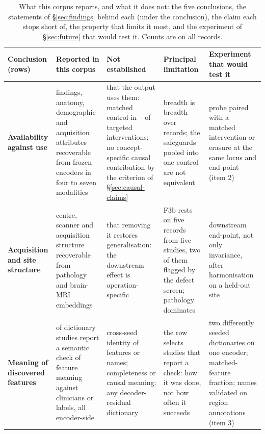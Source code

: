 \begin{table}[!tb]
\centering\footnotesize\setlength\tabcolsep{3pt}\renewcommand{\arraystretch}{1.08}
\caption{What this corpus reports, and what it does not: the five conclusions, the statements of
\S\ref{sec:findings} behind each (under the conclusion), the claim each stops short of, the property that limits it most, and the
experiment of \S\ref{sec:future} that would test it. Counts are on all records.}
\label{tab:synthesis}
\begin{tabular}{@{}L{2.45cm}L{3.3cm}L{3.2cm}L{3.2cm}L{3.2cm}@{}}
\toprule
Conclusion (rows) & Reported in this corpus & Not established & Principal limitation & Experiment that would test it \\
\midrule
\textbf{Availability against use}  & findings, anatomy, demographic and acquisition attributes recoverable from frozen encoders in four to seven modalities & that the output uses them: matched control in \Vspca{}--\Vspc{} of \Vspcn{} targeted interventions; no concept-specific causal contribution by the criterion of \S\ref{sec:causal-claims} & breadth is breadth over records; the safeguards pooled into one control are not equivalent & probe paired with a matched intervention or erasure at the same locus and end-point (item 2) \\
\addlinespace[2pt]
\textbf{Acquisition and site structure}  & centre, scanner and acquisition structure recoverable from pathology and brain-MRI embeddings & that removing it restores generalisation: the downstream effect is operation-specific & F3b rests on five records from five studies, two of them flagged by the defect screen; pathology dominates & downstream end-point, not only invariance, after harmonisation on a held-out site \\
\addlinespace[2pt]
\textbf{Meaning of discovered features}  & \Nsaeval{} of \Nsae{} dictionary studies report a semantic check of feature meaning against clinicians or labels, all encoder-side & cross-seed identity of features or names; completeness or causal meaning; any decoder-residual dictionary & the row selects studies that report a check: how it was done, not how often it succeeds & two differently seeded dictionaries on one encoder; matched-feature fraction; names validated on region annotations (item 3) \\

\end{tabular}
\end{table}
